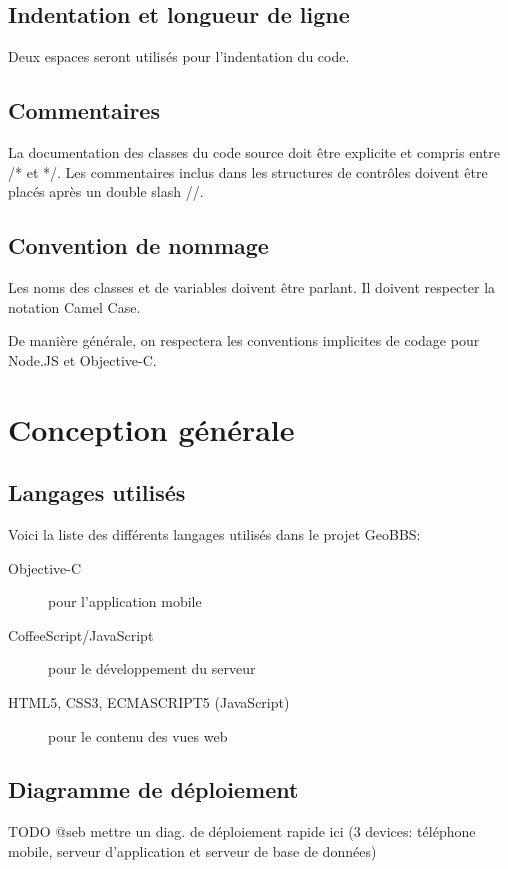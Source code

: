 \documentclass[a4paper,12pt]{report}
\begin{document}
\begin{onehalfspace}
\section{Indentation et longueur de ligne}
Deux espaces seront utilisés pour l'indentation du code. 

\section{Commentaires}

La documentation des classes du code source doit être explicite et compris entre /* et */.
Les commentaires inclus dans les structures de contrôles doivent être placés après un double slash //.

\newpage

\section{Convention de nommage}
Les noms des classes et de variables doivent être parlant. Il doivent respecter la notation Camel Case.

De manière générale, on respectera les conventions implicites de codage pour Node.JS et Objective-C.

\chapter{Conception générale}
\section{Langages utilisés} %
\label{sub:langages_utilis_s}

Voici la liste des différents langages utilisés dans le projet GeoBBS:

\begin{description}
  \item[Objective-C] pour l'application mobile
  \item[CoffeeScript/JavaScript] pour le développement du serveur
  \item[HTML5, CSS3, ECMASCRIPT5 (JavaScript)] pour le contenu des vues web
\end{description}

\section{Diagramme de déploiement} %
\label{sec:diagramme_de_d_ploiement}
TODO @seb mettre un diag. de déploiement rapide ici (3 devices: téléphone mobile, serveur d'application et serveur de base de données)


\end{onehalfspace}
\end{document}
